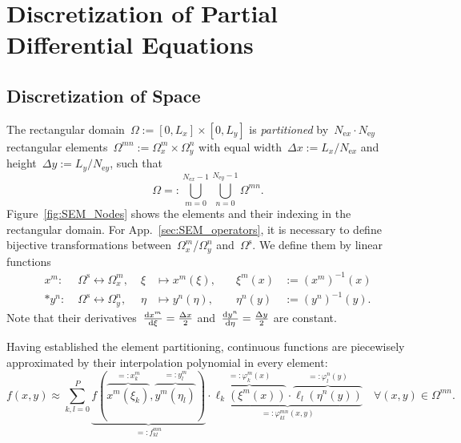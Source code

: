 \documentclass[10pt, ngerman, english,
twoside, open=right,
numbers=noenddot,
declaration=section,
abstract=section,
abstract=multiple,
abstract=notoc,
declaration=notoc,
cd=pale, 
chapterprefix=off, 
chapterpage=false, 
headingsvskip=-10em,
cdgeometry=custom, 
slantedgreek=on,
cdmath=on, 
cdfont=on,
ttfont=false,
mathswap=off,
]{tudscrreprt}
\numberwithin{equation}{chapter}
\newcommand{\sidenote}[1]{
  \leavevmode %
  \marginpar{\hyphenpenalty=1000 \flushleft{\textcolor{HKS41}{#1}}}}
\begin{document}
\chapter{Discretization of Partial Differential Equations}\label{sec:SEM}
\section{Discretization of Space}
\sidenote{Element Partitioning}The rectangular domain~$\Omega := [0, L_x]\times[0,L_y]$ is \emph{partitioned} by~$N_{\text{e}x} \cdot N_{\text{e}y}$ rectangular elements~$\Omega^{mn} := \Omega_x^m \times \Omega_y^n$ with equal width~$\Delta x := L_x/N_{\text{e}x}$ and height~$\Delta y := L_y/N_{\text{e}y}$, such that
\begin{equation}
\Omega =: \bigcup\limits_{m=0}^{N_{\text{e}x}-1} \bigcup\limits_{n=0}^{N_{\text{e}y}-1} \Omega^{mn}\text{.}
\end{equation}
Figure~\ref{fig:SEM_Nodes} shows the elements and their indexing in the rectangular domain. For App.~\ref{sec:SEM_operators}, it is necessary to define bijective transformations between~$\Omega_x^m$/$\Omega_y^n$ and~$\Omega^\text{s}$. We define them by linear functions
\begin{subequations}\begin{alignat}{3}
x^m: &\;\Omega^\text{s} \leftrightarrow \Omega_x^m, &\; \xi &\mapsto x^m(\xi), &\quad \xi^m(x) &:= \left( x^m \right)^{-1}(x)\label{eq:SEM_transform_x}\\* 
y^n: &\;\Omega^\text{s} \leftrightarrow \Omega_y^n, &\; \eta &\mapsto y^n(\eta), &\quad \eta^n(y) &:= \left( y^n \right)^{-1}(y)\text{.} \label{eq:SEM_transform_y}
\end{alignat}\label{eq:SEM_transform}\end{subequations}
Note that their derivatives~$\diff{x^m}{\xi} = \frac{\Delta x}{2}$ and~$\diff{y^n}{\eta} = \frac{\Delta y}{2}$ are constant.\par
\sidenote{Function Discretization and Nodes}Having established the element partitioning, continuous functions are piecewisely approximated by their interpolation polynomial in every element:
\begin{equation}
f(x,y) \approx \sum_{k,l=0}^P \underbrace{f(\overbrace{x^m(\xi_k)}^{\displaystyle =:x^m_k}, \overbrace{y^m(\eta_l)}^{\displaystyle =:y^m_l})}_{\displaystyle =:f^{mn}_{kl}} \cdot \underbrace{\overbrace{\ell_k(\xi^m(x))}^{\displaystyle =:\varphi^m_k(x)} \cdot \overbrace{\ell_l(\eta^n(y))}^{\displaystyle =:\varphi^n_l(y)}}_{\displaystyle =:\varphi^{mn}_{kl}(x,y)}\quad \forall (x,y) \in \Omega^{mn}\text{.}\label{eq:SEM_interpol}
\end{equation}
\end{document}
